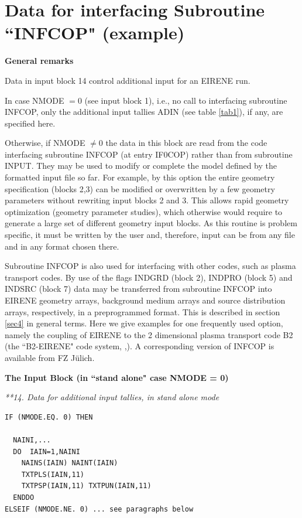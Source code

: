 \newpage
\section{Data for interfacing Subroutine ``INFCOP" (example)} \label{sec2.14}

\medskip

\noindent

{\bf General remarks}

\medskip %

\noindent

Data in input block 14 control additional input for an EIRENE run.

In case NMODE $= 0$ (see input block 1), i.e., no call to interfacing
subroutine INFCOP, only
the additional input tallies ADIN (see table \ref{tab1}), if any, are
specified here.

Otherwise, if NMODE $\neq 0$ the data in this block
are read from the code interfacing subroutine INFCOP (at entry IF0COP)
rather than from subroutine INPUT.
They may be used
to modify or complete the model defined by the formatted input
file so far. For
example, by this option the entire geometry specification
(blocks 2,3) can be modified or overwritten
by a few geometry parameters without rewriting input
blocks 2 and 3. This allows rapid geometry
optimization (geometry parameter studies), which otherwise would
require to generate a large set of different geometry input blocks.
As this routine is problem specific, it must be written by the user
and, therefore, input can be from any file and in any format chosen there.

Subroutine INFCOP is also used for interfacing with other codes,
such as plasma transport codes. By use of the flags INDGRD (block
2), INDPRO (block 5) and INDSRC (block 7) data may be transferred
from subroutine INFCOP into EIRENE geometry arrays, background
medium arrays and source distribution arrays, respectively, in a
preprogrammed format. This is described in section \ref{sec4} in
general terms. Here we give examples for one frequently used
option, namely the coupling of EIRENE to the 2 dimensional plasma
transport code B2 \cite{kn:Braams} (the ``B2-EIRENE" code system,
\cite{kn:Reiter91b},\cite{kn:Reiter92b}). A corresponding version
of INFCOP is available from FZ J\"ulich.

{\bf The Input Block (in ``stand alone" case NMODE = 0)}

\medskip

\noindent

{\sl ***14. Data for additional input tallies, in stand alone mode}
\begin{verbatim}
IF (NMODE.EQ. 0) THEN

  NAINI,...
  DO  IAIN=1,NAINI
    NAINS(IAIN) NAINT(IAIN)
    TXTPLS(IAIN,11)
    TXTPSP(IAIN,11) TXTPUN(IAIN,11)
  ENDDO
ELSEIF (NMODE.NE. 0) ... see paragraphs below
\end{verbatim}

